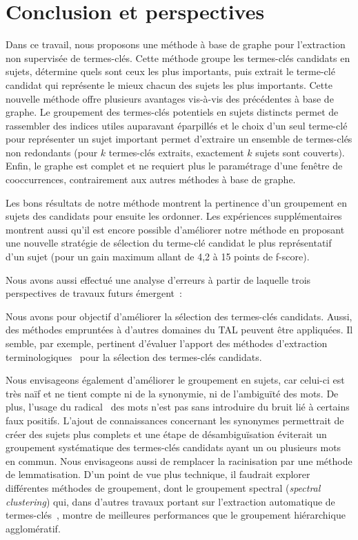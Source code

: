 \section{Conclusion et perspectives}
\label{sec:conclusion_et_perspectives}
  Dans ce travail, nous proposons une méthode à base de graphe pour l'extraction
  non supervisée de termes-clés. Cette méthode groupe les termes-clés candidats
  en sujets, détermine quels sont ceux les plus importants, puis extrait le
  terme-clé candidat qui représente le mieux chacun des sujets les plus
  importants. Cette nouvelle méthode offre plusieurs avantages vis-à-vis des
  précédentes à base de graphe. Le groupement des termes-clés potentiels en
  sujets distincts permet de rassembler des indices utiles auparavant éparpillés
  et le choix d'un seul terme-clé pour représenter un sujet important permet
  d'extraire un ensemble de termes-clés non redondants (pour $k$ termes-clés
  extraits, exactement $k$ sujets sont couverts). Enfin, le graphe est complet
  et ne requiert plus le paramétrage d'une fenêtre de cooccurrences,
  contrairement aux autres méthodes à base de graphe.

  Les bons résultats de notre méthode montrent la pertinence d'un groupement en
  sujets des candidats pour ensuite les ordonner. Les expériences
  supplémentaires montrent aussi qu'il est encore possible d'améliorer notre
  méthode en proposant une nouvelle stratégie de sélection du terme-clé candidat
  le plus représentatif d'un sujet (pour un gain maximum allant de 4,2 à 15
  points de f-score).

  Nous avons aussi effectué une analyse d'erreurs à partir de laquelle trois
  perspectives de travaux futurs émergent~:

  Nous avons pour objectif d'améliorer la sélection des termes-clés candidats.
  Aussi, des méthodes empruntées à d'autres domaines du TAL peuvent être
  appliquées. Il semble, par exemple, pertinent d'évaluer l'apport des méthodes
  d'extraction terminologiques~\cite{castellvi2001automatictermdetection} pour
  la sélection des termes-clés candidats.
  
  Nous envisageons également d'améliorer le groupement en sujets,
  car celui-ci est très naïf et ne tient compte ni de la synonymie, ni de
  l'ambiguïté des mots. De plus, l'usage du
  radical~\cite{porter1980suffixstripping} des mots n'est pas sans introduire du
  bruit lié à certains faux positifs. L'ajout de connaissances concernant les
  synonymes permettrait de créer des sujets plus complets et une étape de
  désambiguïsation éviterait un groupement systématique des termes-clés
  candidats ayant un ou plusieurs mots en commun. Nous envisageons aussi de
  remplacer la racinisation par une
  méthode de lemmatisation. D'un point de vue plus technique, il faudrait
  explorer différentes méthodes de groupement, dont le groupement spectral
  (\textit{spectral clustering}) qui, dans d'autres travaux portant sur
  l'extraction automatique de termes-clés~\cite{liu2009keycluster}, montre de
  meilleures performances que le groupement hiérarchique agglomératif.

